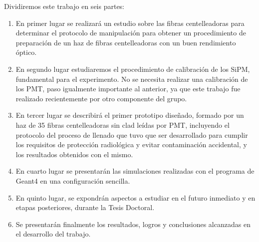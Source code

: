 Dividiremos este trabajo en seis partes:
\begin{enumerate}
\item{} En primer lugar se realizará un estudio sobre las fibras centelleadoras para  determinar  el protocolo de manipulación para obtener un  procedimiento de preparación de  un haz de fibras centelleadoras con un buen rendimiento óptico. 

\item{} En segundo lugar estudiaremos el procedimiento de calibración de los SiPM,  fundamental para el experimento.  No se necesita realizar una calibración de los PMT, paso igualmente importante al anterior, ya que este trabajo fue realizado recientemente por otro componente del grupo.

\item{} En tercer lugar se describirá  el primer prototipo diseñado, formado por un haz de 35 fibras centelleadoras sin clad leídas por PMT,  incluyendo el protocolo del proceso de llenado que tuvo que ser desarrollado para cumplir los requisitos de protección radiológica y evitar contaminación accidental,  y los  resultados obtenidos con el mismo.

\item{} En cuarto lugar se presentarán las simulaciones realizadas con el programa de Geant4 en una configuración sencilla.

\item{} En quinto lugar, se expondrán aspectos a estudiar en el futuro inmediato y en etapas posteriores, durante la Tesis Doctoral. 


\item{} Se presentarán finalmente los resultados, logros y conclusiones alcanzadas en el desarrollo del  trabajo.

\end{enumerate}